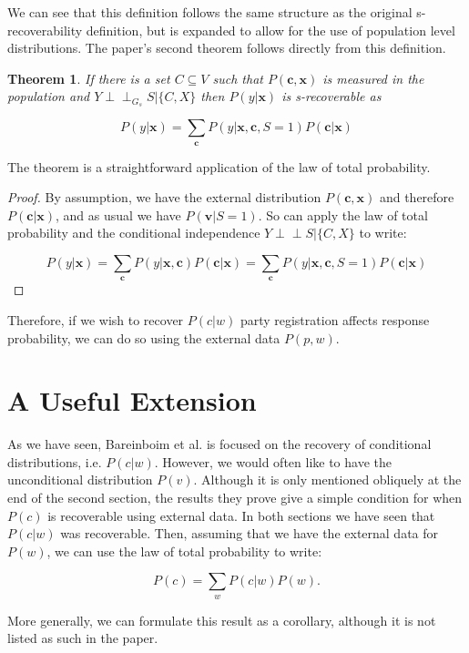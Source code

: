 \documentclass[12pt,twoside]{reedthesis}
\newtheorem{theorem}{Theorem}
\theoremstyle{definition}
\newcommand{\dsep}{\perp \!\!\!\perp}
\begin{document}
We can see that this definition follows the same structure as the original s-recoverability definition, but is expanded to allow for the use of population level distributions. The paper's second theorem follows directly from this definition.

\begin{theorem}
If there is a set $C \subseteq V$ such that $P(\mathbf{c}, \mathbf{x})$ is measured in the population and $Y \dsep_{G_s} S | \{C,X\}$ then $P(y | \mathbf{x})$ is s-recoverable as

$$P(y | \mathbf{x}) = \sum_{\mathbf{c}} P(y | \mathbf{x}, \mathbf{c}, S = 1)P(\mathbf{c} | \mathbf{x})$$
\end{theorem}

The theorem is a straightforward application of the law of total probability.

\begin{proof}
By assumption, we have the external distribution $P(\mathbf{c}, \mathbf{x})$ and therefore $P(\mathbf{c} | \mathbf{x})$, and as usual we have $P(\mathbf{v} | S =  1)$. So can apply the law of total probability and the conditional independence $Y \dsep S | \{C,X\}$ to write:

$$P(y | \mathbf{x}) = \sum_{\mathbf{c}} P(y | \mathbf{x}, \mathbf{c}) P(\mathbf{c} | \mathbf{x}) = \sum_{\mathbf{c}} P(y | \mathbf{x}, \mathbf{c}, S = 1) P(\mathbf{c} | \mathbf{x})$$

\end{proof}

Therefore, if we wish to recover $P(c | w)$ party registration affects response probability, we can do so using the external data $P(p , w)$.

\section{A Useful Extension}
As we have seen, Bareinboim et al. is focused on the recovery of conditional distributions, i.e. $P(c|w)$. However, we would often like to have the unconditional distribution $P(v)$. Although it is only mentioned obliquely at the end of the second section, the results they prove give a simple condition for when $P(c)$ is recoverable using external data. In both sections we have seen that $P(c|w)$ was recoverable. Then, assuming that we have the external data for $P(w)$, we can use the law of total probability to write:

$$P(c) = \sum_{w} P(c|w)P(w).$$

More generally, we can formulate this result as a corollary, although it is not listed as such in the paper.
\end{document}

